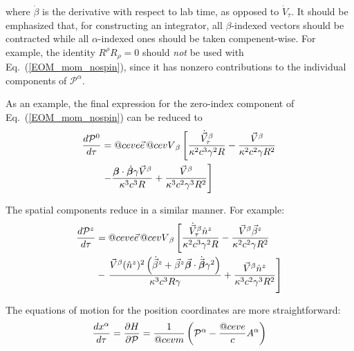 \documentclass[reprint,
               amsmath,amssymb,nofootinbib, aps%
              ]{revtex4-2}
\makeatletter
\DeclareRobustCommand{\cev}[1]{%
  {\mathpalette\do@cev{#1}}%
}
\newcommand{\do@cev}[2]{%
  \vbox{\offinterlineskip
    \sbox\z@{$\m@th#1 x$}%
    \ialign{##\cr
      \hidewidth\reflectbox{$\m@th#1\vec{}\mkern4mu$}\hidewidth\cr
      \noalign{\kern-\ht\z@}
      $\m@th#1#2$\cr
    }%
  }%
}
\makeatother
\begin{document}
where $\dot{\beta}$ is the derivative with respect to lab time, as opposed to $\dot{V}_\tau$.
\noindent It should be emphasized that, for constructing an integrator, all $\beta$-indexed vectors should be contracted while all $\alpha$-indexed ones should be taken compenent-wise. For example, the identity $R^{\rho} R_{\rho} = 0 $ should \textit{not} be used with Eq.~(\ref{EOM_mom_nospin}), since it has nonzero contributions to the individual components of $\mathcal{P}^{\alpha}$.

As an example, the final expression for the zero-index component of Eq.~(\ref{EOM_mom_nospin}) can be reduced to
\begin{align}
    \frac{d \mathcal{P}^0}{d \tau} &=
    \cev{e}  \vec{e} \, \cev{V}_{\beta} \left[
    \frac{\dot{\vec{V}}^\beta_\tau} {\kappa^{2} c^{3} \gamma^{2} R}
    \nonumber - \frac{ \vec{V}^{\beta}} {\kappa^{2} c^{2} \gamma R^{2}} \right.
    \noindent \\
    & \left. -\frac{\boldsymbol{\beta}\cdot\dot{\boldsymbol{\beta}} \gamma \vec{V}^{\beta}}{\kappa^3 c^{3} R}
    +  \frac{\vec{V}^{\beta} }{\kappa^3 c^{2} \gamma^{3} R^{2}}
    \right]
    \label{eq:eoms_mom_trans}
\end{align}

\noindent The spatial components reduce in a similar manner. For example:
\vspace{-0.2cm}
\begin{align}
    \frac{d \mathcal{P}^z}{d \tau} &=
    \cev{e}  \vec{e} \, \cev{V}_{\beta} \left[
    \frac{\dot{\vec{V}}^\beta_\tau \hat{n}^{z}} {\kappa^2 c^{3} \gamma^{2} R}
    \nonumber - \frac{ \vec{V}^{\beta} \vec{\beta}^{z}} {\kappa^2 c^{2} \gamma R^{2}} \right.
    \noindent \\
    &- \left. \frac{ \vec{V}^{\beta} (\hat{n}^z)^2 \left(\dot{\vec{\beta}}^z + \vec{\beta}^z \vec{\boldsymbol{\beta}}\cdot\dot{\vec{\boldsymbol{\beta}}} \gamma^{2}\right)}{\kappa^3 c^{3} R \gamma}
    +  \frac{\vec{V}^{\beta} \hat{n}^{z} }{\kappa^3 c^{2} \gamma^{3} R^{2}}
    \right]
    \label{eq:eoms_mom_long}
\end{align}

The equations of motion for the position coordinates are more straightforward:
\vspace{0.1cm}
\begin{equation}
\frac{d x^{\alpha}}{d \tau}= \frac{\partial H}{\partial \mathcal{P}} = \frac{1}{\cev{m}}\left(\mathcal{P}^{\alpha}-\frac{\cev{e}}{c} A^{\alpha}\right)
\label{eq:eoms_pos}
\end{equation}
\end{document}
